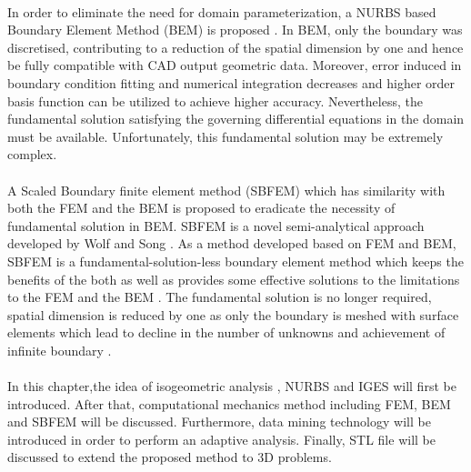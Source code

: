 \paragraph{}
In order to eliminate the need for domain parameterization, a NURBS based Boundary Element Method (BEM) is proposed \cite{Li2011,Taka2012,Beli2013,Sco2013,Sim2013}.
In BEM, only the boundary was discretised, contributing to a reduction of the spatial dimension by one and hence be fully compatible with CAD output geometric data.
Moreover, error induced in boundary condition fitting and numerical integration decreases and higher order basis function can be utilized to achieve higher accuracy.
Nevertheless, the fundamental solution satisfying the governing differential equations in the domain must be available.
Unfortunately, this fundamental solution may be extremely complex.

\paragraph{}
A Scaled Boundary finite element method (SBFEM) which has similarity with both the FEM and the BEM is proposed to eradicate the necessity of fundamental solution in BEM. SBFEM is a novel semi-analytical approach developed by Wolf and Song \cite{Wol1999}.
As a method developed based on FEM and BEM, SBFEM is a fundamental-solution-less boundary element method which keeps the benefits of the both as well as provides some effective solutions to the limitations to the FEM and the BEM \cite{Wol1999}.
The fundamental solution is no longer required, spatial dimension is reduced by one as only the boundary is meshed with surface elements which lead to decline in the number of unknowns and achievement of infinite boundary \cite{Wol2003}.

\paragraph{}
In this chapter,the idea of isogeometric analysis \cite{Hug2005}, NURBS and IGES will first be introduced.
After that, computational mechanics method including FEM, BEM and SBFEM will be discussed.
Furthermore, data mining technology will be introduced in order to perform an adaptive analysis.
Finally, STL file will be discussed to extend the proposed method to 3D problems.


